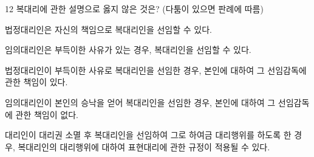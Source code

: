 \begin{question}{12}
복대리에 관한 설명으로 옳지 않은 것은? (다툼이 있으면 판례에 따름)
\begin{choices}
  \item 법정대리인은 자신의 책임으로 복대리인을 선임할 수 있다.
  \item 임의대리인은 부득이한 사유가 있는 경우, 복대리인을 선임할 수 있다.
  \item 법정대리인이 부득이한 사유로 복대리인을 선임한 경우, 본인에 대하여 그 선임감독에 관한 책임이 있다.
  \item 임의대리인이 본인의 승낙을 얻어 복대리인을 선임한 경우, 본인에 대하여 그 선임감독에 관한 책임이 없다.
  \item 대리인이 대리권 소멸 후 복대리인을 선임하여 그로 하여금 대리행위를 하도록 한 경우, 복대리인의 대리행위에 대하여 표현대리에 관한 규정이 적용될 수 있다.
\end{choices}
\end{question}
